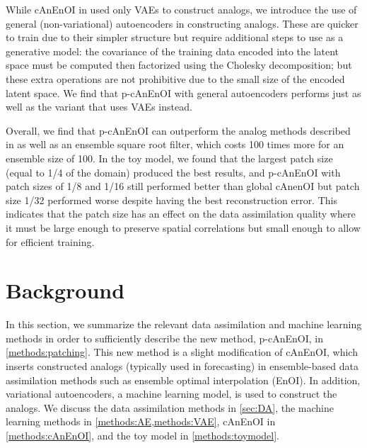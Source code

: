 \documentclass[final,3p]{elsarticle}
\theoremstyle{break}
\begin{document}
While cAnEnOI in \cite{grooms2020analog} used only VAEs to construct analogs, we introduce the use of general (non-variational) autoencoders in constructing analogs.
These are quicker to train due to their simpler structure but require additional steps to use as a generative model: the covariance of the training data encoded into the latent space must be computed then factorized using the Cholesky decomposition; but these extra operations are not prohibitive due to the small size of the encoded latent space. 
We find that p-cAnEnOI with general autoencoders performs just as well as the variant that uses VAEs instead.\par 

Overall, we find that p-cAnEnOI can outperform the analog methods described in \cite{grooms2020analog} as well as an ensemble square root filter, which costs 100 times more for an ensemble size of 100.
In the toy model, we found that the largest patch size (equal to 1/4 of the domain) produced the best results, and p-cAnEnOI with patch sizes of 1/8 and 1/16 still performed better than global cAnenOI but patch size 1/32 performed worse despite having the best reconstruction error.
This indicates that the patch size has an effect on the data assimilation quality where it must be large enough to preserve spatial correlations but small enough to allow for efficient training.
 
\section{Background}
\label{sec:background}
In this section, we summarize the relevant data assimilation and machine learning methods in order to sufficiently describe the new method, p-cAnEnOI, in \cref{methods:patching}. 
This new method is a slight modification of cAnEnOI, which inserts constructed analogs (typically used in forecasting) in ensemble-based data assimilation methods such as ensemble optimal interpolation (EnOI).
In addition, variational autoencoders, a machine learning model, is used to construct the analogs. 
We discuss the data assimilation methods in \cref{sec:DA}, the machine learning methods in \cref{methods:AE,methods:VAE}, cAnEnOI in \cref{methods:cAnEnOI}, and the toy model in \cref{methods:toymodel}.
\end{document}
